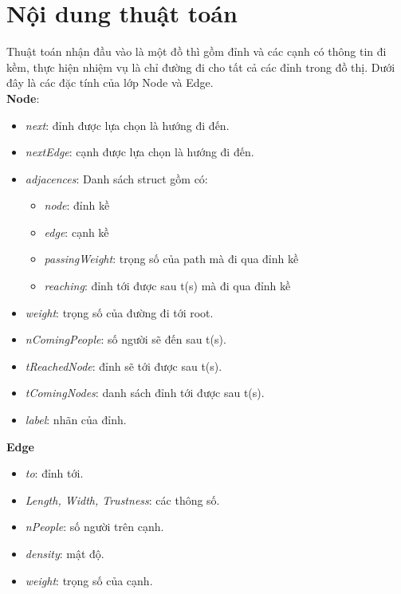 \documentclass{article}
\begin{document}
    \section{Nội dung thuật toán}
    \newpage
    Thuật toán nhận đầu vào là một đồ thì gồm đỉnh và các cạnh có thông tin
    đi kềm, thực hiện nhiệm vụ là chỉ đường đi cho tất cả các đỉnh trong đồ
    thị. Dưới đây là các đặc tính của lớp Node và Edge. \\ 
    \textbf{Node}: 
    \begin{itemize}
        \item \textit{next}: đỉnh được lựa chọn là hướng đi đến.
        \item \textit{nextEdge}: cạnh được lựa chọn là hướng đi đến.
        \item \textit{adjacences}: Danh sách struct gồm có:
        \begin{itemize}
            \item \textit{node}: đỉnh kề
            \item \textit{edge}: cạnh kề
            \item \textit{passingWeight}: trọng số của path mà đi qua đỉnh kề 
            \item \textit{reaching}: đỉnh tới được sau t(s) mà đi qua đỉnh 
            kề
        \end{itemize}    
        \item \textit{weight}: trọng số của đường đi tới root.
        \item \textit{nComingPeople}: số người sẽ đến sau t(s).
        \item \textit{tReachedNode}: đỉnh sẽ tới được sau t(s).
        \item \textit{tComingNodes}: danh sách đỉnh tới được sau t(s).
        \item \textit{label}: nhãn của đỉnh.
    \end{itemize}
    \textbf{Edge}
    \begin{itemize}
        \item \textit{to}: đỉnh tới.
        \item \textit{Length, Width, Trustness}: các thông số.
        \item \textit{nPeople}: số người trên cạnh.
        \item \textit{density}: mật độ.
        \item \textit{weight}: trọng số của cạnh.
    \end{itemize}
\end{document}
